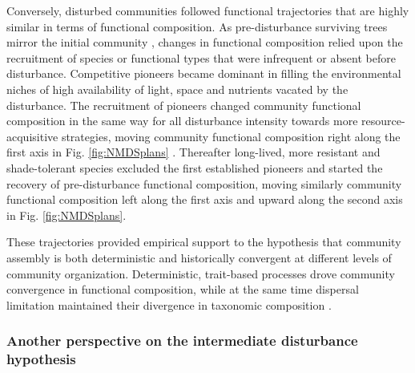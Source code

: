 \documentclass[
  11pt,
  french,
  A4paper,
  extrafontsizes,onecolumn,openright
  ]{memoir}
\begin{document}
Conversely, disturbed communities followed functional trajectories that
are highly similar in terms of functional composition. As
pre-disturbance surviving trees mirror the initial community
\autocite{Herault2018}, changes in functional composition relied upon
the recruitment of species or functional types that were infrequent or
absent before disturbance. Competitive pioneers became dominant in
filling the environmental niches of high availability of light, space
and nutrients vacated by the disturbance. The recruitment of pioneers
changed community functional composition in the same way for all
disturbance intensity towards more resource-acquisitive strategies,
moving community functional composition right along the first axis in
Fig. \ref{fig:NMDSplans} \autocites{Westoby1998}{Wright2004}{Reich2014}.
Thereafter long-lived, more resistant and shade-tolerant species
excluded the first established pioneers and started the recovery of
pre-disturbance functional composition, moving similarly community
functional composition left along the first axis and upward along the
second axis in Fig. \ref{fig:NMDSplans}.

These trajectories provided empirical support to the hypothesis that
community assembly is both deterministic and historically convergent at
different levels of community organization. Deterministic, trait-based
processes drove community convergence in functional composition, while
at the same time dispersal limitation maintained their divergence in
taxonomic composition \autocite{Fukami2005}.

\subsubsection{Another perspective on the intermediate disturbance
hypothesis}\label{another-perspective-on-the-intermediate-disturbance-hypothesis}
\end{document}
